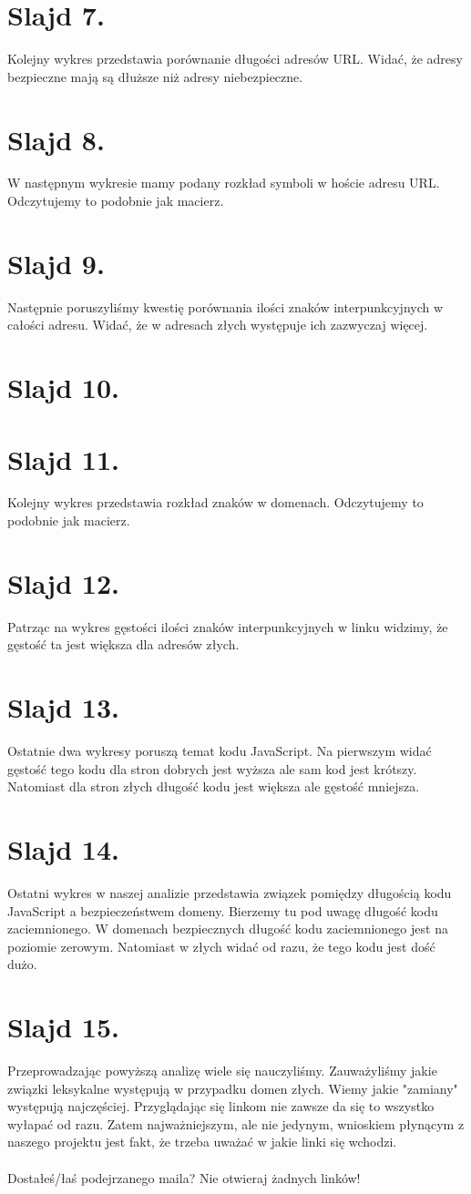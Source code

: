 \documentclass{article}
\begin{document}
\section{Slajd 7.}
{
	Kolejny wykres przedstawia porównanie długości adresów URL. Widać, że adresy bezpieczne mają są dłuższe niż adresy niebezpieczne.
}
\section{Slajd 8.}
{
	W następnym wykresie mamy podany rozkład symboli w hoście adresu URL. Odczytujemy to podobnie jak macierz.
}
\section{Slajd 9.}
{
	Następnie poruszyliśmy kwestię porównania ilości znaków interpunkcyjnych w całości adresu. Widać, że w adresach złych występuje ich zazwyczaj więcej.
}
\section{Slajd 10.}
{
	
}
\section{Slajd 11.}
{
	Kolejny wykres przedstawia rozkład znaków w domenach. Odczytujemy to podobnie jak macierz.
}
\section{Slajd 12.}
{
	Patrząc na wykres gęstości ilości znaków interpunkcyjnych w linku widzimy, że gęstość ta jest większa dla adresów złych.
}
\section{Slajd 13.}
{
	Ostatnie dwa wykresy poruszą temat kodu JavaScript. Na pierwszym widać gęstość tego kodu dla stron dobrych jest wyższa ale sam kod jest krótszy. Natomiast dla stron złych długość kodu jest większa ale gęstość mniejsza. 
}
\section{Slajd 14.}
{
	Ostatni wykres w naszej analizie przedstawia związek pomiędzy długością kodu JavaScript a bezpieczeństwem domeny. Bierzemy tu pod uwagę długość kodu zaciemnionego. W domenach bezpiecznych długość kodu zaciemnionego jest na poziomie zerowym. Natomiast w złych widać od razu, że tego kodu jest dość dużo.
}
\section{Slajd 15.}
{
	Przeprowadzając powyższą analizę wiele się nauczyliśmy. Zauważyliśmy jakie związki leksykalne występują w przypadku domen złych. Wiemy jakie "zamiany" występują najczęściej. Przyglądając się linkom nie zawsze da się to wszystko wyłapać od razu. Zatem najważniejszym, ale nie jedynym, wnioskiem płynącym z naszego projektu jest fakt, że trzeba uważać w jakie linki się wchodzi.\\
	~\\
	Dostałeś/łaś podejrzanego maila? Nie otwieraj żadnych linków!
}
\end{document}

